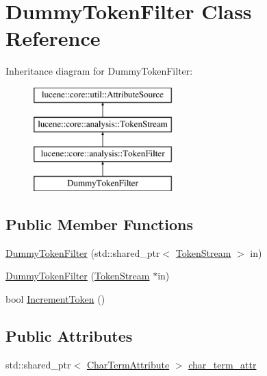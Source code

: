 \hypertarget{classDummyTokenFilter}{}\section{Dummy\+Token\+Filter Class Reference}
\label{classDummyTokenFilter}
Inheritance diagram for Dummy\+Token\+Filter\+:\begin{figure}[H]
\begin{center}
\leavevmode
\includegraphics[height=4.000000cm]{classDummyTokenFilter}
\end{center}
\end{figure}
\subsection*{Public Member Functions}
\begin{DoxyCompactItemize}
\item 
\mbox{\hyperlink{classDummyTokenFilter_a9662eaa1241759e097feadba88df7726}{Dummy\+Token\+Filter}} (std\+::shared\+\_\+ptr$<$ \mbox{\hyperlink{classlucene_1_1core_1_1analysis_1_1TokenStream}{Token\+Stream}} $>$ in)
\item 
\mbox{\hyperlink{classDummyTokenFilter_a159c2c68741206a402c7b80c3f0ef14f}{Dummy\+Token\+Filter}} (\mbox{\hyperlink{classlucene_1_1core_1_1analysis_1_1TokenStream}{Token\+Stream}} $\ast$in)
\item 
bool \mbox{\hyperlink{classDummyTokenFilter_a6a57ec2684cc58f61ec807bbebabae63}{Increment\+Token}} ()
\end{DoxyCompactItemize}
\subsection*{Public Attributes}
\begin{DoxyCompactItemize}
\item 
std\+::shared\+\_\+ptr$<$ \mbox{\hyperlink{classlucene_1_1core_1_1analysis_1_1tokenattributes_1_1CharTermAttribute}{Char\+Term\+Attribute}} $>$ \mbox{\hyperlink{classDummyTokenFilter_ab057e032de3b055c554c4ab4abf1c3da}{char\+\_\+term\+\_\+attr}}
\end{DoxyCompactItemize}
